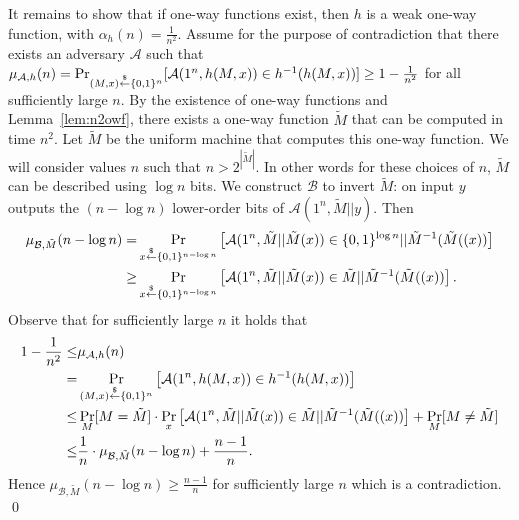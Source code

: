 It remains to show that if one-way functions exist, then $h$ is a weak one-way function, with $\alpha_h(n) = \frac{1}{n^2}$.
Assume for the purpose of contradiction that there exists an adversary $\mathcal{A}$ such that $\mu_{\mathcal{A},h}(n) = \Pr_{(M,x) \stackrel{\$}{\leftarrow} \{0,1\}^{n}}[ \mathcal{A}(1^{n}, h(M,x)) \in h^{-1}(h(M,x))]\geq 1-\frac{1}{n^2}$ for all sufficiently large $n$.
By the existence of one-way functions and Lemma~\ref{lem:n2owf}, there exists a one-way function $\tilde M$ that can be computed in time $n^2$. Let $\tilde M$ be the uniform machine that computes this one-way function.
We will consider values $n$ such that $n > 2^{|\tilde M|}$. In other words for these choices of $n$, $\tilde M$ can be described using $\log n$ bits.
We construct $\mathcal{B}$ to invert $\tilde M$: on input $y$ outputs the $(n-\log n)$ lower-order bits of $\mathcal{A}(1^n, \tilde M||y)$. Then
\begin{align*}
\mu_{\mathcal{B},\tilde M}(n-\log n) =& \Pr_{x \stackrel{\$}{\leftarrow} \{0,1\}^{n-\log n}}\left[\mathcal{A}(1^{n}, \tilde M || \tilde M(x)) \in \{0,1\}^{\log n} || \tilde M^{-1}(\tilde M((x))\right]\\
\geq& \Pr_{x \stackrel{\$}{\leftarrow} \{0,1\}^{n-\log n}}\left[\mathcal{A}(1^{n}, \tilde M || \tilde M(x)) \in \tilde{M} || \tilde M^{-1}(\tilde M((x))\right].
\end{align*}
Observe that for sufficiently large $n$ it holds that
\begin{align*}
1-\frac{1}{n^2} \leq& \mu_{\mathcal{A},h}(n)\\
=& \Pr_{(M,x) \stackrel{\$}{\leftarrow} \{0,1\}^{n}}\left[ \mathcal{A}(1^{n}, h(M,x)) \in h^{-1}(h(M,x))\right]\\
\leq& \Pr_{M }[M = \tilde M] \cdot \Pr_{x }\left[ \mathcal{A}(1^{n}, \tilde M||\tilde M(x)) \in  \tilde{M} || \tilde M^{-1}(\tilde M((x))\right] + \Pr_{M }[M \neq \tilde M]  \\
\leq&  \frac{1}{n} \cdot \mu_{\mathcal{B},\tilde M}(n-\log n) +\frac{n-1}{n}.
\end{align*}
Hence $\mu_{\mathcal{B},\tilde M}(n-\log n) \geq \frac{n-1}{n}$  for sufficiently large $n$ which is a contradiction.
\qed

